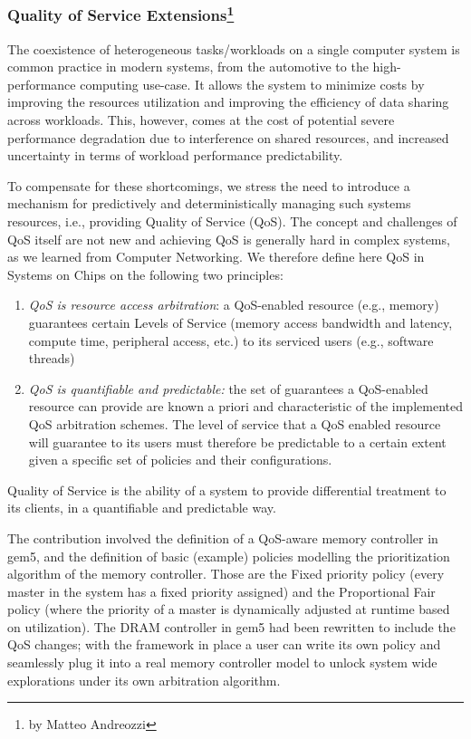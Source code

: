 \subsubsection[Quality of Service Extensions]{Quality of Service Extensions\footnote{by Matteo Andreozzi}}

The coexistence of heterogeneous tasks/workloads on a single computer system is common practice in modern systems, from the automotive to the high-performance computing use-case.
It allows the system to minimize costs by improving the resources utilization and improving the efficiency of data sharing across workloads.
This, however, comes at the cost of potential severe performance degradation due to interference on shared resources, and increased uncertainty in terms of workload performance predictability.

To compensate for these shortcomings, we stress the need to introduce a mechanism for predictively and deterministically managing such systems resources, i.e., providing Quality of Service (QoS).
The concept and challenges of QoS itself are not new and achieving QoS is generally hard in complex systems, as we learned from Computer Networking.
We therefore define here QoS in Systems on Chips on the following two principles:
\begin{enumerate}
    \item \emph{QoS is resource access arbitration}: a QoS-enabled resource (e.g., memory) guarantees certain Levels of Service (memory access bandwidth and latency, compute time, peripheral access, etc.) to its serviced users (e.g., software threads)
    \item \emph{QoS is quantifiable and predictable:} the set of guarantees a QoS-enabled resource can provide are known a priori and characteristic of the implemented QoS arbitration schemes.
    The level of service that a QoS enabled resource will guarantee to its users must therefore be predictable to a certain extent given a specific set of policies and their configurations.
\end{enumerate}

Quality of Service is the ability of a system to provide differential treatment to its clients, in a quantifiable and predictable way.

The contribution involved the definition of a QoS-aware memory controller in gem5, and the definition of basic (example) policies modelling the prioritization algorithm of the memory controller. Those are the Fixed priority policy (every master in the system has a fixed priority assigned) and the Proportional Fair policy (where the priority of a master is dynamically adjusted at runtime based on utilization).
The DRAM controller in gem5 had been rewritten to include the QoS changes; with the framework in place a user can write its own policy and seamlessly plug it into a real memory controller model to unlock system wide explorations under its own arbitration algorithm.

